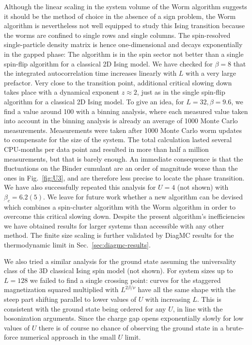 \documentclass[twocolumn,superscriptaddress,pra,showpacs,longbibliography]{revtex4-1}
\newcommand{\<}{\langle}
\renewcommand{\>}{\rangle}
\begin{document}
Although the linear scaling in the system volume of the Worm algorithm suggests it should be the method of choice in the absence of a sign problem, the Worm algorithm is nevertheless not well equipped to study this Ising transition because the worms are confined to single rows and single columns. 
The spin-resolved single-particle density matrix is hence one-dimensional and decays exponentially in the gapped phase: 
The algorithm is in the spin sector not better than a single spin-flip algorithm for a classical 2D Ising model. We have checked for $\beta = 8$ that  the integrated autocorrelation time increases linearly with $L$  with  a very large prefactor. Very close to the transition point, additional critical slowing down takes place with a dynamical exponent $z \approx 2$, just as in the single spin-flip algorithm for a classical 2D Ising model. 
To give an idea, for $L=32, \beta = 9.6$, we find a value around 100 with a binning analysis, where each measured value taken into account in the binning analysis is already an average of 1000 Monte Carlo measurements. Measurements were taken after 1000 Monte Carlo worm updates to compensate for the size of the system. The total calculation lasted several CPU-months per data point and resulted in more than half a million measurements, but that is barely enough.
An immediate consequence is that the fluctuations on the Binder cumulant are an order of magnitude worse than the ones in Fig.~\ref{fig:U3}, and are therefore less precise to locate the phase transition.
We have also successfully repeated this analysis for $U=4$ (not shown) with $\beta_c = 6.2(5)$. We leave for future work whether a new algorithm can be devised which combines a spin-cluster algorithm with the Worm algorithm in order to overcome this critical slowing down.
Despite the present algorithm's inefficiencies we have obtained results for larger systems than accessible with any other method. The finite size scaling is further validated by DiagMC results for the thermodynamic limit in Sec.~\ref{sec:diagmc-results}.

We also tried a similar analysis for the ground state assuming the universality class of the 3D classical Ising spin model (not shown). For system sizes up to $L=128$ we failed to find a single crossing point: curves for the staggered magnetization squared multiplied with $L^{2 \beta/\nu}$ have all the same shape with the steep part shifting parallel to lower values of $U$ with increasing $L$. This is consistent with the ground state being ordered for any $U$, in line with the bosonization arguments. Since the charge gap opens exponentially slowly for low values of $U$ there is of course no chance of observing the ground state in a brute-force numerical approach in the small $U$ limit. 
\end{document}
